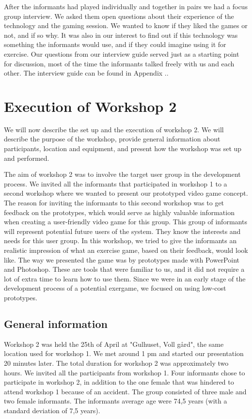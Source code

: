 After the informants had played individually and together in pairs we had a focus group interview. We asked them open questions about their experience of the technology and the gaming session. We wanted to know if they liked the games or not, and if so why. It was also in our interest to find out if this technology was something the informants would use, and if they could imagine using it for exercise. Our questions from our interview guide served just as a starting point for discussion, most of the time the informants talked freely with us and each other. The interview guide can be found in Appendix ..                 

\section{Execution of Workshop 2}
\label{sec:ws2}
We will now describe the set up and the execution of workshop 2. We will describe the purpose of the workshop, provide general information about participants, location and equipment, and present how the workshop was set up and performed. 

The aim of workshop 2 was to involve the target user group in the development process. We invited all the informants that participated in workshop 1 to a second workshop where we wanted to present our prototyped video game concept. The reason for inviting the informants to this second workshop was to get feedback on the prototypes, which would serve as highly valuable information when creating a user-friendly video game for this group. This group of informants will represent potential future users of the system. They know the interests and needs for this user group. In this workshop, we tried to give the informants an realistic impression of what an exercise game, based on their feedback, would look like. The way we presented the game was by prototypes made with PowerPoint and Photoshop. These are tools that were familiar to us, and it did not require a lot of extra time to learn how to use them. Since we were in an early stage of the development process of a potential exergame, we focused on using low-cost prototypes.  

\subsection{General information}
Workshop 2 was held the 25th of April at "Gulhuset, Voll gård", the same location used for workshop 1. We met around 1 pm and started our presentation 20 minutes later. The total duration for workshop 2 was approximately two hours. We invited all the participants from workshop 1. Four informants chose to participate in workshop 2, in addition to the one female that was hindered to attend workshop 1 because of an accident. The group consisted of three male and two female informants. The informants average age were 74,5 years (with a standard deviation of 7,5 years).  

